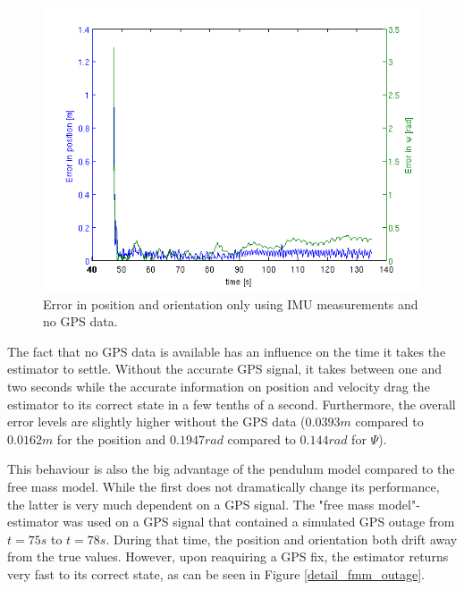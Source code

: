 \begin{figure}[hb]
\centering
\includegraphics[width=1\textwidth]{pictures/2_2_errors_noGPS.png}
\caption{Error in position and orientation only using IMU measurements and no GPS data.}
\label{error_noGPS}
\end{figure}
The fact that no GPS data is available has an influence on the time it takes the estimator to settle. Without the accurate GPS signal, it takes between one and two seconds while the accurate information on position and velocity drag the estimator to its correct state in a few tenths of a second. Furthermore, the overall error levels are slightly higher without the GPS data ($0.0393 m$ compared to $0.0162 m$ for the position and $0.1947 rad$ compared to $0.144 rad$ for $\Psi$). 

This behaviour is also the big advantage of the pendulum model compared to the free mass model. While the first does not dramatically change its performance, the latter is very much dependent on a GPS signal. The "free mass model"-estimator was used on a GPS signal that contained a simulated GPS outage from $t=75 s$ to $t=78 s$. During that time, the position and orientation both drift away from the true values. However, upon reaquiring a GPS fix, the estimator returns very fast to its correct state, as can be seen in Figure \ref{detail_fmm_outage}.

